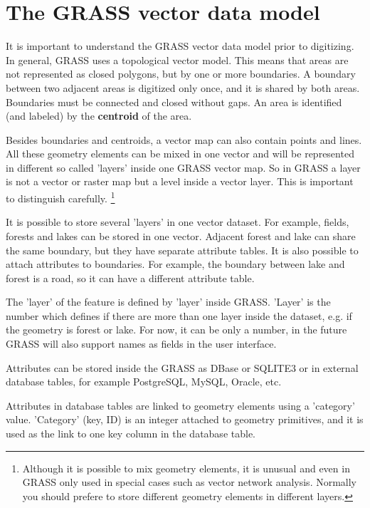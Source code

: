 \section{The GRASS vector data model}\label{label_vectmodel}

It is important to understand the GRASS vector data model prior to
digitizing. In general, GRASS uses a topological
vector model. This means that areas are not represented
as closed polygons, but by one or more boundaries. A boundary between two
adjacent areas is digitized only once, and it is shared by both areas.
Boundaries must be connected and closed without gaps. An area is identified (and labeled)
by the \textbf{centroid} of the area.

Besides boundaries and centroids, a vector map can also contain
points and lines. All these geometry elements can be mixed
in one vector and will be represented in different so called 'layers' inside
one GRASS vector map. So in GRASS a layer is not a vector or raster map but a
level inside a vector layer. This is important to distinguish carefully.
\footnote{Although it
is possible to mix geometry elements, it is unusual and even in GRASS only
used in special cases such as vector network analysis. Normally you should
prefere to store different geometry elements in different layers.}

It is possible to store several 'layers' in one vector dataset. For example,
fields, forests and lakes can be stored in one vector. Adjacent
forest and lake can share the same boundary, but they have separate attribute
tables. It is also possible to attach attributes to boundaries. For example,
the boundary between lake and forest is a road, so it can have a different
attribute table.

The 'layer' of the feature is defined by 'layer' inside GRASS. 'Layer' is the
number which defines if there are more than one layer inside the dataset, e.g.
if the geometry is forest or lake. For now, it can be only a number, in the
future GRASS will also support names as fields in the user interface.

Attributes can be stored inside the GRASS  as DBase or
SQLITE3 or in external database tables, for example PostgreSQL, MySQL,
Oracle, etc.

Attributes in database tables are linked to geometry elements using
a 'category' value. 'Category' (key, ID) is an
integer attached to geometry primitives, and it is used as the link to one
key column in the database table.

